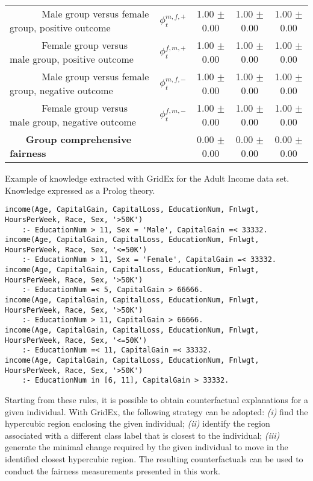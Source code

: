 \documentclass[letterpaper]{article} %
\begin{document}
\begin{table*}[t!]
{\begin{center}
\begin{tabular}{ll|c|c|c}
			~ ~ ~ ~ Male group versus female group, positive outcome & $\phi_t^{m,f,+}$ & 1.00 $\pm$ 0.00 & 1.00 $\pm$ 0.00 & 1.00 $\pm$ 0.00 \\
			~ ~ ~ ~ Female group versus male group, positive outcome & $\phi_t^{f,m,+}$ & 1.00 $\pm$ 0.00 & 1.00 $\pm$ 0.00 & 1.00 $\pm$ 0.00 \\
			~ ~ ~ ~ Male group versus female group, negative outcome & $\phi_t^{m,f,-}$ & 1.00 $\pm$ 0.00 & 1.00 $\pm$ 0.00 & 1.00 $\pm$ 0.00 \\
			~ ~ ~ ~ Female group versus male group, negative outcome & $\phi_t^{f,m,-}$ & 1.00 $\pm$ 0.00 & 1.00 $\pm$ 0.00 & 1.00 $\pm$ 0.00 \\
			~ ~ \textbf{Group comprehensive fairness} & & 0.00 $\pm$ 0.00 & 0.00 $\pm$ 0.00 & 0.00 $\pm$ 0.00 \\
			\bottomrule
		\end{tabular}
	\end{center}
}
\end{table*}

\begin{listing*}[t!]
	\caption{Example of knowledge extracted with GridEx for the Adult Income data set. Knowledge expressed as a Prolog theory.}\label{lst:rules}
	\begin{lstlisting}[]
income(Age, CapitalGain, CapitalLoss, EducationNum, Fnlwgt, HoursPerWeek, Race, Sex, '>50K') 
    :- EducationNum > 11, Sex = 'Male', CapitalGain =< 33332.
income(Age, CapitalGain, CapitalLoss, EducationNum, Fnlwgt, HoursPerWeek, Race, Sex, '<=50K') 
    :- EducationNum > 11, Sex = 'Female', CapitalGain =< 33332.
income(Age, CapitalGain, CapitalLoss, EducationNum, Fnlwgt, HoursPerWeek, Race, Sex, '>50K') 
    :- EducationNum =< 5, CapitalGain > 66666.
income(Age, CapitalGain, CapitalLoss, EducationNum, Fnlwgt, HoursPerWeek, Race, Sex, '>50K') 
    :- EducationNum > 11, CapitalGain > 66666.
income(Age, CapitalGain, CapitalLoss, EducationNum, Fnlwgt, HoursPerWeek, Race, Sex, '<=50K') 
    :- EducationNum =< 11, CapitalGain =< 33332.
income(Age, CapitalGain, CapitalLoss, EducationNum, Fnlwgt, HoursPerWeek, Race, Sex, '>50K') 
    :- EducationNum in [6, 11], CapitalGain > 33332.
	\end{lstlisting}
\end{listing*}

Starting from these rules, it is possible to obtain counterfactual explanations for a given individual. With GridEx, the following strategy can be adopted: \textit{(i)} find the hypercubic region enclosing the given individual; \textit{(ii)} identify the region associated with a different class label that is closest to the individual; \textit{(iii)} generate the minimal change required by the given individual to move in the identified closest hypercubic region.
%
The resulting counterfactuals can be used to conduct the fairness measurements presented in this work.
\end{document}
